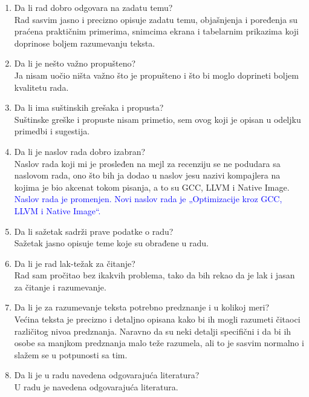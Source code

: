 \documentclass[a4paper]{report}
\newcommand{\odgovor}[1]{\textcolor{blue}{#1}}
\begin{document}
\begin{enumerate}
\item Da li rad dobro odgovara na zadatu temu?\\
Rad sasvim jasno i precizno opisuje zadatu temu, objašnjenja i poređenja su praćena praktičnim primerima, snimcima ekrana i tabelarnim prikazima koji doprinose boljem razumevanju teksta.

\item Da li je nešto važno propušteno?\\
Ja nisam uočio ništa važno što je propušteno i što bi moglo doprineti boljem kvalitetu rada.

\item Da li ima suštinskih grešaka i propusta?\\
Suštinske greške i propuste nisam primetio, sem ovog koji je opisan u odeljku primedbi i sugestija.

\item Da li je naslov rada dobro izabran?\\
Naslov rada koji mi je prosleđen na mejl za recenziju se ne podudara sa naslovom rada, ono što bih ja dodao u naslov jesu nazivi kompajlera na kojima je bio akcenat tokom pisanja, a to su GCC, LLVM i Native Image. \\
\odgovor{Naslov rada je promenjen. Novi naslov rada je „Optimizacije kroz GCC, LLVM i Native Image“.}

\item Da li sažetak sadrži prave podatke o radu?\\
Sažetak jasno opisuje teme koje su obrađene u radu.

\item Da li je rad lak-težak za čitanje?\\
Rad sam pročitao bez ikakvih problema, tako da bih rekao da je lak i jasan za čitanje i razumevanje.

\item Da li je za razumevanje teksta potrebno predznanje i u kolikoj meri?\\
Većina teksta je precizno i detaljno opisana kako bi ih mogli razumeti čitaoci različitog nivoa predznanja. Naravno da su neki detalji specifični i da bi ih osobe sa manjkom predznanja malo teže razumela, ali to je sasvim normalno i slažem se u potpunosti sa tim.

\item Da li je u radu navedena odgovarajuća literatura?\\
U radu je navedena odgovarajuća literatura.


\end{enumerate}
\end{document}
